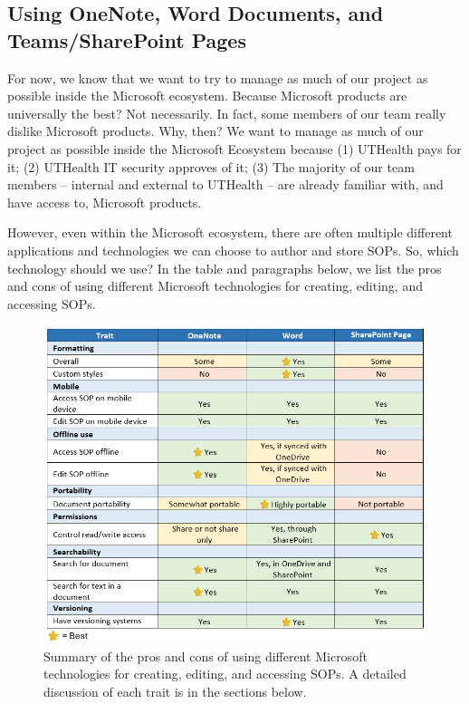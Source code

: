 \documentclass[
  letterpaper,
  DIV=11,
  numbers=noendperiod]{scrreprt}
\begin{document}
\subsection*{Using OneNote, Word Documents, and Teams/SharePoint
Pages}\label{using-onenote-word-documents-and-teamssharepoint-pages}

For now, we know that we want to try to manage as much of our project as
possible inside the Microsoft ecosystem. Because Microsoft products are
universally the best? Not necessarily. In fact, some members of our team
really dislike Microsoft products. Why, then? We want to manage as much
of our project as possible inside the Microsoft Ecosystem because (1)
UTHealth pays for it; (2) UTHealth IT security approves of it; (3) The
majority of our team members -- internal and external to UTHealth -- are
already familiar with, and have access to, Microsoft products.

However, even within the Microsoft ecosystem, there are often multiple
different applications and technologies we can choose to author and
store SOPs. So, which technology should we use? In the table and
paragraphs below, we list the pros and cons of using different Microsoft
technologies for creating, editing, and accessing SOPs.

\begin{figure}[H]

{\centering \includegraphics[width=3\textwidth,height=\textheight]{chapters/authoring_sops/../../graphics/microsoft_tech.png}

}

\caption{Summary of the pros and cons of using different Microsoft
technologies for creating, editing, and accessing SOPs. A detailed
discussion of each trait is in the sections below.}

\end{figure}%
\end{document}
